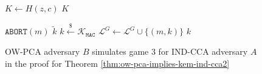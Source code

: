 \documentclass[runningheads]{llncs}
\newcommand{\mac}{\texttt{MAC}}
\newcommand{\pco}{\texttt{PCO}}
\newcommand{\leftsample}{\stackrel{\$}{\leftarrow}}
\begin{document}
\begin{figure}[h]
\begin{minipage}[t]{0.49\textwidth}
\begin{algorithm}[H]
\begin{algorithmic}[1]
                \Else
                    \State $K \leftarrow H(z, c)$
                \EndIf
                \State \Return $K$
            \end{algorithmic}
        \end{algorithm}
        \begin{algorithm}[H]
            \caption*{$\mathcal{O}^G_B(m)$}
            \begin{algorithmic}[1]
                \If{$\pco(m, {c^\prime}^\ast) = 1$}
                    \State $\texttt{ABORT}(m)$
                \EndIf
                    \State \Return $\tilde{k}$
                \EndIf
                \State $k \leftsample \mathcal{K}_\mac$
                \State $\mathcal{L}^G \leftarrow \mathcal{L}^G \cup \{(m, k)\}$
                \State \Return $k$
            \end{algorithmic}
        \end{algorithm}
    \end{minipage}
    \caption{OW-PCA adversary $B$ simulates game 3 for IND-CCA adversary $A$ in the proof for Theorem \ref{thm:ow-pca-implies-kem-ind-cca2}}\label{fig:ow-pca-simulates-game-3}
\end{figure}
\end{document}
